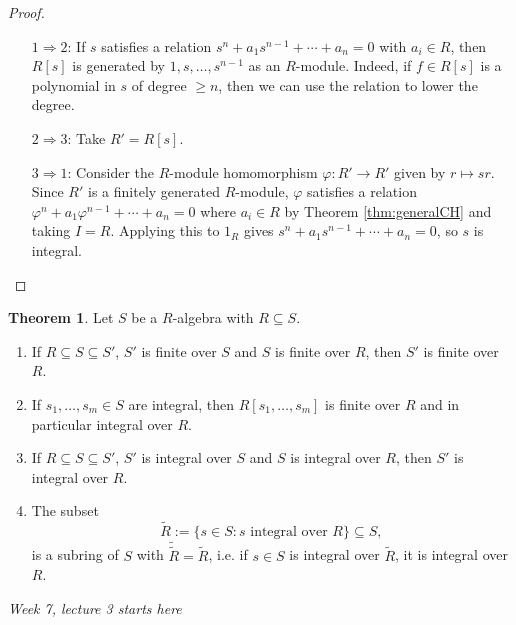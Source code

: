 \documentclass[a4paper]{article}
\theoremstyle{definition}
\newtheorem{thm}[defn]{Theorem}
\begin{document}
\begin{proof} \

\begin{enumerate}
\item[$1\Rightarrow 2$:] If $s$ satisfies a relation $s^n+a_1s^{n-1}+\cdots+a_n=0$ with $a_i\in R$, then $R[s]$ is generated by $1,s,\ldots,s^{n-1}$ as an $R$-module. Indeed, if $f\in R[s]$ is a polynomial in $s$ of degree $\geq n$, then we can use the relation to lower the degree.
\item[$2\Rightarrow 3$:] Take $R'=R[s]$.
\item[$3\Rightarrow 1$:] Consider the $R$-module homomorphism $\varphi:R'\rightarrow R'$ given by $r\mapsto sr$. Since $R'$ is a finitely generated $R$-module, $\varphi$ satisfies a relation $\varphi^n+a_1\varphi^{n-1}+\cdots+a_n=0$ where $a_i\in R$ by Theorem \ref{thm:generalCH} and taking $I=R$. Applying this to $1_R$ gives $s^n+a_1s^{n-1}+\cdots+a_n=0$, so $s$ is integral.
\end{enumerate}
\end{proof}

\begin{thm}
Let $S$ be a $R$-algebra with $R\subseteq S$.
\begin{enumerate}
\item If $R\subseteq S\subseteq S'$, $S'$ is finite over $S$ and $S$ is finite over $R$, then $S'$ is finite over $R$.
\item If $s_1,\ldots,s_m\in S$ are integral, then $R[s_1,\ldots,s_m]$ is finite over $R$ and in particular integral over $R$.
\item If $R\subseteq S\subseteq S'$, $S'$ is integral over $S$ and $S$ is integral over $R$, then $S'$ is integral over $R$.
\item The subset
\[
\widetilde R:=\{s\in S:s\text{ integral over }R\}\subseteq S,
\]
is a subring of $S$ with $\widetilde{\widetilde R}=\widetilde R$, i.e. if $s\in S$ is integral over $\widetilde R$, it is integral over $R$.
\end{enumerate}
\end{thm}

\begin{flushright}
\textit{Week 7, lecture 3 starts here}
\end{flushright}
\end{document}
